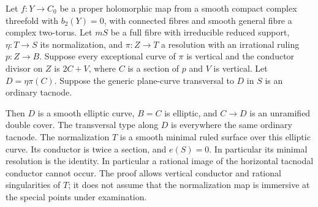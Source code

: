 \begin{proposition}\hypertarget{tag-01B8}{}\label{cdp:st:A.5.18}


Let $f:Y\to C_0$ be a proper holomorphic map from a smooth
compact complex threefold with $b_2(Y)=0$, with connected
fibres and smooth general fibre a complex two-torus.
Let $mS$ be a full fibre with irreducible reduced support,
$\eta:T\to S$ its normalization, and $\pi:Z\to T$ a
resolution with an irrational ruling $p:Z\to B$.
Suppose every exceptional curve of $\pi$ is vertical and
the conductor divisor on $Z$ is $2C+V$, where $C$ is a
section of $p$ and $V$ is vertical. Let $D=\eta\pi(C)$.
Suppose the generic plane-curve transversal to $D$ in $S$ is an
ordinary tacnode.

Then $D$ is a smooth elliptic curve, $B=C$ is elliptic,
and $C\to D$ is an unramified double cover. The transversal
type along $D$ is everywhere the same ordinary tacnode.
The normalization $T$ is a smooth minimal ruled surface
over this elliptic curve. Its conductor is twice a
section, and $e(S)=0$. In particular its minimal
resolution is the identity.
In particular a rational image of
the horizontal tacnodal conductor cannot occur. The proof
allows vertical conductor and rational singularities of
$T$; it does not assume that the normalization map is
immersive at the special points under examination.
\end{proposition}

